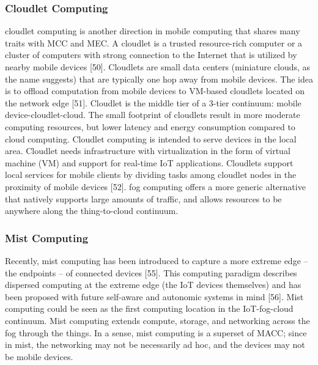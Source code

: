 \subsubsection{Cloudlet Computing}
cloudlet computing is another direction in mobile computing that shares many traits with MCC and MEC. A cloudlet is a trusted resource-rich computer or a cluster of computers with strong connection to the Internet that is utilized by nearby mobile devices [50]. Cloudlets are small data centers (miniature
clouds, as the name suggests) that are typically one hop away from mobile devices. The idea is to offload computation from mobile devices to VM-based cloudlets located on the network edge [51]. Cloudlet is the middle tier of a 3-tier continuum: mobile device-cloudlet-cloud. The small footprint of cloudlets result in more moderate computing resources, but lower latency and energy consumption compared to cloud computing. Cloudlet computing is intended to serve devices in the local area. Cloudlet needs infrastructure with virtualization in the form of virtual machine (VM) and support for real-time IoT applications.
Cloudlets support local services for mobile clients by dividing tasks among cloudlet nodes in the proximity of mobile devices [52]. fog computing offers a more generic alternative that natively supports large amounts of traffic, and allows resources to be anywhere along the thing-to-cloud continuum.

\subsubsection{Mist Computing}
Recently, mist computing has been introduced to capture a more extreme edge – the endpoints – of connected devices [55]. This computing paradigm describes dispersed computing at the extreme edge (the IoT devices themselves) and has been proposed with future self-aware and autonomic systems in mind [56]. Mist computing
could be seen as the first computing location in the IoT-fog-cloud continuum. Mist computing extends compute, storage, and networking across the fog through the things. In a sense, mist computing is a superset of MACC; since in mist, the networking may not be necessarily ad hoc, and the devices may not be mobile devices.

